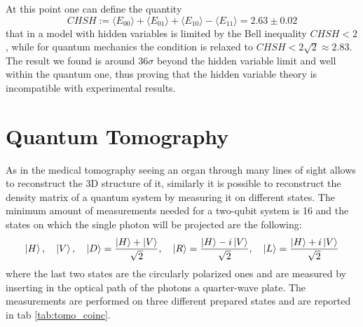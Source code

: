 \documentclass[a4paper, 11pt]{article}
\begin{document}
    At this point one can define the quantity
    \begin{equation*}
      CHSH := \langle E_{00} \rangle + \langle E_{01} \rangle + \langle E_{10} \rangle - \langle E_{11} \rangle = 2.63 \pm 0.02
    \end{equation*}
    that in a model with hidden variables is limited by the Bell inequality $CHSH < 2$, while for quantum mechanics the condition is relaxed to $CHSH < 2\sqrt{2} \approx 2.83$. The result we found is around $36\sigma$ beyond the hidden variable limit and well within the quantum one, thus proving that the hidden variable theory is incompatible with experimental results.


  \section{Quantum Tomography}
    As in the medical tomography seeing an organ through many lines of sight allows to reconstruct the 3D structure of it, similarly it is possible to reconstruct the density matrix of a quantum system by measuring it on different states. The minimum amount of measurements needed for a two-qubit system is 16 and the states on which the single photon will be projected are the following:
    \begin{gather*}
      \ket{H}, \quad \ket{V}, \quad \ket{D} = \frac{\ket{H} + \ket{V}}{\sqrt{2}},
      \quad \ket{R}  = \frac{\ket{H} -i \ket{V}}{\sqrt{2}}, \quad \ket{L}  = \frac{\ket{H} +i \ket{V}}{\sqrt{2}}
    \end{gather*}
    where the last two states are the circularly polarized ones and are measured by inserting in the optical path of the photons a quarter-wave plate.
    The measurements are performed on three different prepared states and are reported in tab \ref{tab:tomo_coinc}.
\end{document}
